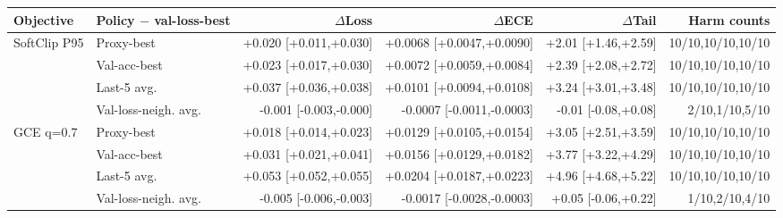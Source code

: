\begin{tabular}{llrrrr}
\toprule
Objective & Policy $-$ val-loss-best & $\Delta$Loss & $\Delta$ECE & $\Delta$Tail & Harm counts \\
\midrule
SoftClip P95 & Proxy-best & +0.020 [+0.011,+0.030] & +0.0068 [+0.0047,+0.0090] & +2.01 [+1.46,+2.59] & 10/10,10/10,10/10 \\
 & Val-acc-best & +0.023 [+0.017,+0.030] & +0.0072 [+0.0059,+0.0084] & +2.39 [+2.08,+2.72] & 10/10,10/10,10/10 \\
 & Last-5 avg. & +0.037 [+0.036,+0.038] & +0.0101 [+0.0094,+0.0108] & +3.24 [+3.01,+3.48] & 10/10,10/10,10/10 \\
 & Val-loss-neigh. avg. & -0.001 [-0.003,-0.000] & -0.0007 [-0.0011,-0.0003] & -0.01 [-0.08,+0.08] & 2/10,1/10,5/10 \\
GCE q=0.7 & Proxy-best & +0.018 [+0.014,+0.023] & +0.0129 [+0.0105,+0.0154] & +3.05 [+2.51,+3.59] & 10/10,10/10,10/10 \\
 & Val-acc-best & +0.031 [+0.021,+0.041] & +0.0156 [+0.0129,+0.0182] & +3.77 [+3.22,+4.29] & 10/10,10/10,10/10 \\
 & Last-5 avg. & +0.053 [+0.052,+0.055] & +0.0204 [+0.0187,+0.0223] & +4.96 [+4.68,+5.22] & 10/10,10/10,10/10 \\
 & Val-loss-neigh. avg. & -0.005 [-0.006,-0.003] & -0.0017 [-0.0028,-0.0003] & +0.05 [-0.06,+0.22] & 1/10,2/10,4/10 \\
\bottomrule
\end{tabular}
